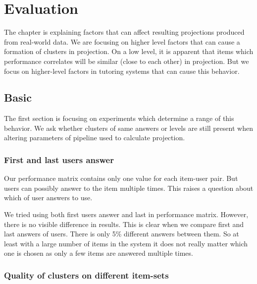 \documentclass[
  digital, %
  table,   %
  nolof,     %
  nolot,     %
  nocover,
  color,
  final, %
]{fithesis3}
\begin{document}

\chapter{Evaluation}\label{evaluation}

The chapter is explaining factors that can affect resulting projections produced from real-world data. We are focusing on higher level factors that can cause a formation of clusters in projection. On a low level, it is apparent that items which performance correlates will be similar (close to each other) in projection. But we focus on higher-level factors in tutoring systems that can cause this behavior.

\section{Basic}\label{evaluation-basic}

The first section is focusing on experiments which determine a range of this behavior. We ask whether clusters of same answers or levels are still present when altering parameters of pipeline used to calculate projection.

\subsection{First and last users answer}\label{first-and-last-users-answer}


Our performance matrix contains only one value for each item-user pair. But users can possibly answer to the item multiple times. This raises a question about which of user answers to use.


We tried using both first users answer and last in performance matrix. However, there is no visible difference in results. This is clear when we compare first and last answers of users. There is only 5\% different answers between them. So at least with a large number of items in the system it does not really matter which one is chosen as only a few items are answered multiple times.

\subsection{Quality of clusters on different item-sets}\label{quality-of-clusters}
\end{document}
